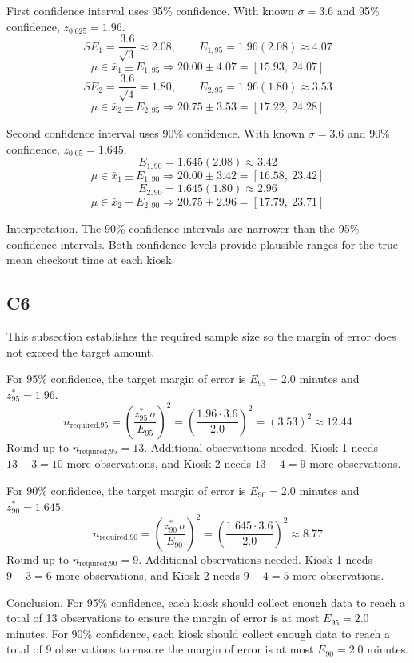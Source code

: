\begin{ExamProblems}
		First confidence interval uses 95\% confidence.
		With known $\sigma = 3.6$ and 95\% confidence, $z_{0.025}=1.96$.
		\[
		SE_1 = \frac{3.6}{\sqrt{3}} \approx 2.08, \qquad E_{1,95} = 1.96(2.08) \approx 4.07
		\]
		\[
		\mu \in \bar{x}_1 \pm E_{1,95} \Rightarrow 20.00 \pm 4.07 = [15.93,\ 24.07]
		\]
		\[
		SE_2 = \frac{3.6}{\sqrt{4}} = 1.80, \qquad E_{2,95} = 1.96(1.80) \approx 3.53
		\]
		\[
		\mu \in \bar{x}_2 \pm E_{2,95} \Rightarrow 20.75 \pm 3.53 = [17.22,\ 24.28]
		\]
		
		Second confidence interval uses 90\% confidence.
		With known $\sigma = 3.6$ and 90\% confidence, $z_{0.05}=1.645$.
		\[
		E_{1,90} = 1.645(2.08) \approx 3.42
		\]
		\[
		\mu \in \bar{x}_1 \pm E_{1,90} \Rightarrow 20.00 \pm 3.42 = [16.58,\ 23.42]
		\]
		\[
		E_{2,90} = 1.645(1.80) \approx 2.96
		\]
		\[
		\mu \in \bar{x}_2 \pm E_{2,90} \Rightarrow 20.75 \pm 2.96 = [17.79,\ 23.71]
		\]
		
		Interpretation.
		The 90\% confidence intervals are narrower than the 95\% confidence intervals.
		Both confidence levels provide plausible ranges for the true mean checkout time at each kiosk.
		
		\subsection*{C6}
		This subsection establishes the required sample size so the margin of error does not exceed the target amount.
		
		For 95\% confidence, the target margin of error is $E_{95} = 2.0$ minutes and $z^*_{95} = 1.96$.
		\[
		n_{\text{required,95}} = \left(\frac{z^*_{95}\,\sigma}{E_{95}}\right)^2
		= \left(\frac{1.96 \cdot 3.6}{2.0}\right)^2
		= \left(3.53\right)^2
		\approx 12.44
		\]
		Round up to $n_{\text{required,95}} = 13$.
		Additional observations needed.
		Kiosk 1 needs $13 - 3 = 10$ more observations, and Kiosk 2 needs $13 - 4 = 9$ more observations.
		
		For 90\% confidence, the target margin of error is $E_{90} = 2.0$ minutes and $z^*_{90} = 1.645$.
		\[
		n_{\text{required,90}} = \left(\frac{z^*_{90}\,\sigma}{E_{90}}\right)^2
		= \left(\frac{1.645 \cdot 3.6}{2.0}\right)^2
		\approx 8.77
		\]
		Round up to $n_{\text{required,90}} = 9$.
		Additional observations needed.
		Kiosk 1 needs $9 - 3 = 6$ more observations, and Kiosk 2 needs $9 - 4 = 5$ more observations.
		
		Conclusion.
		For 95\% confidence, each kiosk should collect enough data to reach a total of 13 observations to ensure the margin of error is at most $E_{95} = 2.0$ minutes.
		For 90\% confidence, each kiosk should collect enough data to reach a total of 9 observations to ensure the margin of error is at most $E_{90} = 2.0$ minutes.
		

\end{ExamProblems}

